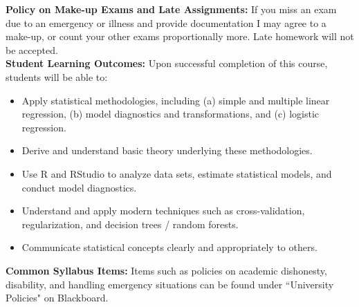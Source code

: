 \documentclass[11pt]{report}
\newenvironment{myitemize}
{ \begin{itemize}
    \setlength{\itemsep}{5pt}
    \setlength{\parskip}{0pt}
    \setlength{\parsep}{0pt}     }
{ \end{itemize}                  }
\begin{document}
\textbf{Policy on Make-up Exams and Late Assignments:}  If you miss an exam due to an emergency or illness and provide documentation I may agree to a make-up, or count your other exams proportionally more.  Late homework will not be accepted.\\

\textbf{Student Learning Outcomes:}  Upon successful completion of this course, students will be able to:
\begin{myitemize}
\item Apply statistical methodologies, including (a) simple and multiple linear regression, (b) model diagnostics and transformations, and (c) logistic regression.
\item Derive and understand basic theory underlying these methodologies. 
\item Use R and RStudio to analyze data sets, estimate statistical models, and conduct model diagnostics.
\item Understand and apply modern techniques such as cross-validation, regularization, and decision trees / random forests.
\item Communicate statistical concepts clearly and appropriately to others.\\    
\end{myitemize}

\textbf{Common Syllabus Items:}  Items such as policies on academic dishonesty, disability, and handling emergency situations can be found under ``University Policies" on Blackboard.
\end{document}
